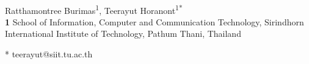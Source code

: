 \documentclass[10pt,letterpaper]{article}
\begin{document}
	\vspace*{0.2in}
	
	\begin{flushleft}
		{\Large
			\textbf{} %
		}
		\newline
		\\
		Ratthamontree Burimas\textsuperscript{1},
		Teerayut Horanont\textsuperscript{1*}
		\\
		\bigskip
		\textbf{1} School of Information, Computer and Communication Technology, Sirindhorn International Institute of Technology, Pathum Thani, Thailand
		\\
		\bigskip
		

		* teerayut@siit.tu.ac.th
		
	\end{flushleft}
\end{document}

